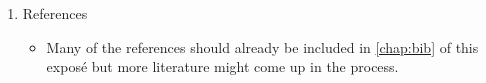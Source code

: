 \begin{enumerate}
    \item References
    \begin{itemize}
        \item
            Many of the references should already be included in
            \autoref{chap:bib} of this exposé but more literature might
            come up in the process. 
    \end{itemize}
\end{enumerate}
